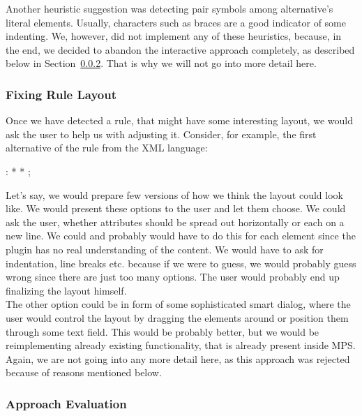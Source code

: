 Another heuristic suggestion was detecting pair symbols among alternative's literal elements.
Usually, characters such as braces are a good indicator of some indenting.
We, however, did not implement any of these heuristics, because, in the end, we decided to abandon the interactive approach completely, as described below in Section~\ref{chap:interactive_approach_evaluation}.
That is why we will not go into more detail here.

\subsubsection{Fixing Rule Layout}

Once we have detected a rule, that might have some interesting layout, we would ask the user to help us with adjusting it.
Consider, for example, the first alternative of the  rule from the XML language:

\begin{antlr}
	  :   \literal{<}  * \literal{>} * \literal{</}  \literal{>} ;
\end{antlr}

Let's say, we would prepare few versions of how we think the layout could look like.
We would present these options to the user and let them choose.
We could ask the user, whether attributes should be spread out horizontally or each on a new line.
We could and probably would have to do this for each element since the plugin has no real understanding of the content.
We would have to ask for indentation, line breaks etc. because if we were to guess, we would probably guess wrong since there are just too many options.
The user would probably end up finalizing the layout himself.
\\

The other option could be in form of some sophisticated smart dialog, where the user would control the layout by dragging the elements around or position them through some text field.
This would be probably better, but we would be reimplementing already existing functionality, that is already present inside MPS.
Again, we are not going into any more detail here, as this approach was rejected because of reasons mentioned below.

\subsubsection{Approach Evaluation}
\label{chap:interactive_approach_evaluation}

